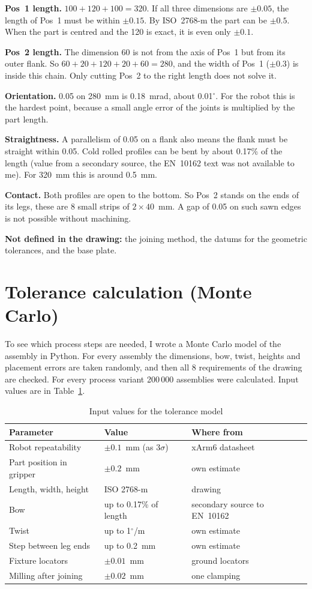\documentclass[11pt,a4paper]{article}
\begin{document}
\textbf{Pos~1 length.} $100+120+100 = 320$. If all three dimensions are $\pm0.05$, the length of Pos~1 must be within $\pm0.15$. By ISO~2768-m the part can be $\pm0.5$. When the part is centred and the 120 is exact, it is even only $\pm0.1$.

\textbf{Pos~2 length.} The dimension 60 is not from the axis of Pos~1 but from its outer flank. So $60+20+120+20+60 = 280$, and the width of Pos~1 ($\pm0.3$) is inside this chain. Only cutting Pos~2 to the right length does not solve it.

\textbf{Orientation.} 0.05 on 280~mm is 0.18~mrad, about 0.01$^\circ$. For the robot this is the hardest point, because a small angle error of the joints is multiplied by the part length.

\textbf{Straightness.} A parallelism of 0.05 on a flank also means the flank must be straight within 0.05. Cold rolled profiles can be bent by about 0.17\% of the length (value from a secondary source, the EN~10162 text was not available to me). For 320~mm this is around 0.5~mm.

\textbf{Contact.} Both profiles are open to the bottom. So Pos~2 stands on the ends of its legs, these are 8 small strips of $2\times40$~mm. A gap of 0.05 on such sawn edges is not possible without machining.

\textbf{Not defined in the drawing:} the joining method, the datums for the geometric tolerances, and the base plate.

\section{Tolerance calculation (Monte Carlo)}
To see which process steps are needed, I wrote a Monte Carlo model of the assembly in Python. For every assembly the dimensions, bow, twist, heights and placement errors are taken randomly, and then all 8 requirements of the drawing are checked. For every process variant 200\,000 assemblies were calculated. Input values are in Table~\ref{tab:param}.

\begin{table}[H]\centering
\caption{Input values for the tolerance model}\label{tab:param}
\begin{tabular}{lll}\toprule
Parameter & Value & Where from\\\midrule
Robot repeatability & $\pm0.1$~mm (as $3\sigma$) & xArm6 datasheet\\
Part position in gripper & $\pm0.2$~mm & own estimate\\
Length, width, height & ISO 2768-m & drawing\\
Bow & up to 0.17\% of length & secondary source to EN~10162\\
Twist & up to 1$^\circ$/m & own estimate\\
Step between leg ends & up to 0.2~mm & own estimate\\
Fixture locators & $\pm0.01$~mm & ground locators\\
Milling after joining & $\pm0.02$~mm & one clamping\\\bottomrule
\end{tabular}
\end{table}
\end{document}
